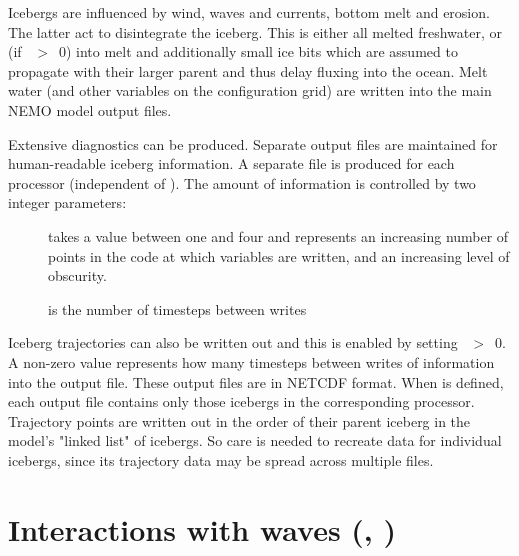 \documentclass[../main/NEMO_manual]{subfiles}
\begin{document}
Icebergs are influenced by wind, waves and currents, bottom melt and erosion.
The latter act to disintegrate the iceberg.
This is either all melted freshwater,
or (if ~$>$~0) into melt and additionally small ice bits
which are assumed to propagate with their larger parent and thus delay fluxing into the ocean.
Melt water (and other variables on the configuration grid) are written into the main NEMO model output files.

Extensive diagnostics can be produced.
Separate output files are maintained for human-readable iceberg information.
A separate file is produced for each processor (independent of ).
The amount of information is controlled by two integer parameters:
\begin{description}
\item[] takes a value between one and four and
  represents an increasing number of points in the code at which variables are written,
  and an increasing level of obscurity.
\item[] is the number of timesteps between writes
\end{description}

Iceberg trajectories can also be written out and this is enabled by setting ~$>$~0.
A non-zero value represents how many timesteps between writes of information into the output file.
These output files are in NETCDF format.
When  is defined, each output file contains only those icebergs in the corresponding processor.
Trajectory points are written out in the order of their parent iceberg in the model's "linked list" of icebergs.
So care is needed to recreate data for individual icebergs,
since its trajectory data may be spread across multiple files.

\section{Interactions with waves (\protect{}, \protect{})}
\label{sec:SBC_wave}

\end{document}

